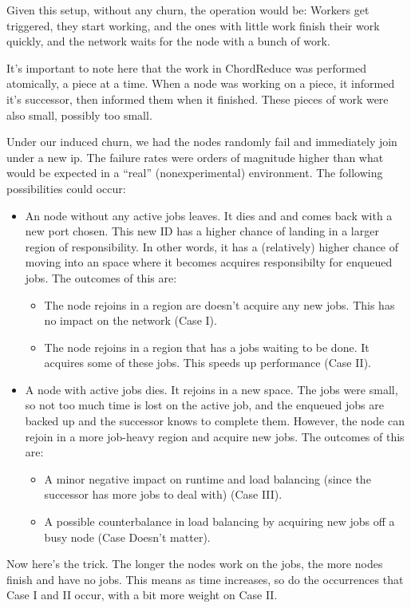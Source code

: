 \documentclass[10pt,letterpaper,twoside]{report}
\begin{document}
Given this setup, without any churn, the operation would be:
Workers get triggered, they start working, and the ones with little work finish their work quickly, and the network waits for the node with a bunch of work.

It's important to note here that the work in ChordReduce was performed atomically, a piece at a time.
When a node was working on a piece, it informed it's successor, then informed them when it finished.
These pieces of work were also small, possibly too small.

Under our induced churn, we had the nodes randomly fail and  immediately join under a new ip.
The failure rates were orders of magnitude higher than what would be expected in a ``real'' (nonexperimental) environment.
The following possibilities could occur:
\begin{itemize}
	\item An node without any active jobs leaves.
	It dies and and comes back with a new port chosen.
	This new ID has a higher chance of landing in a larger region of responsibility.
	In other words, it has a (relatively) higher chance of moving into an space where it becomes acquires responsibilty for enqueued jobs.
	The outcomes of this are:
	\begin{itemize}
		\item The node rejoins in a region are doesn't acquire any new jobs.
		This has no impact on the network (Case I).
		\item The node rejoins in a region that has a jobs waiting to be done.
		It acquires some of these jobs.
		This speeds up performance (Case II).
	\end{itemize}
	\item A node with active jobs dies.
	It rejoins in a new space.
	The jobs were small, so not too much time is lost on the active job, and the enqueued jobs are backed up and the successor knows to complete them.
	However, the node can rejoin in a more job-heavy region and acquire new jobs.
	The outcomes of this are:
	\begin{itemize}
		\item A minor negative impact on runtime and load balancing (since the successor has more jobs to deal with) (Case III).
		\item A possible counterbalance in load balancing by acquiring new jobs off a busy node (Case Doesn't matter).
	\end{itemize}
\end{itemize}

Now here's the trick.
The longer the nodes work on the jobs, the more nodes finish and have no jobs.
This means as time increases, so do the occurrences that Case I and II occur, with a bit more weight on Case II.
\end{document}
